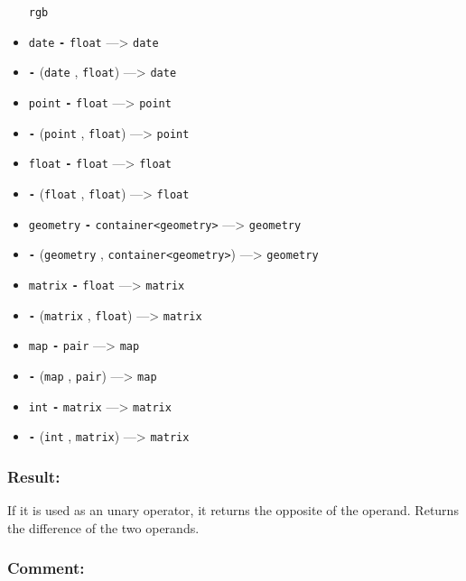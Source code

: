 \documentclass[]{book}
\theoremstyle{definition}
\theoremstyle{definition}
\theoremstyle{definition}
\theoremstyle{remark}
\begin{document}
\begin{itemize}
  \texttt{rgb}
\item
  \texttt{date} \textbf{\texttt{-}} \texttt{float} ---\textgreater{}
  \texttt{date}
\item
  \textbf{\texttt{-}} (\texttt{date} , \texttt{float}) ---\textgreater{}
  \texttt{date}
\item
  \texttt{point} \textbf{\texttt{-}} \texttt{float} ---\textgreater{}
  \texttt{point}
\item
  \textbf{\texttt{-}} (\texttt{point} , \texttt{float})
  ---\textgreater{} \texttt{point}
\item
  \texttt{float} \textbf{\texttt{-}} \texttt{float} ---\textgreater{}
  \texttt{float}
\item
  \textbf{\texttt{-}} (\texttt{float} , \texttt{float})
  ---\textgreater{} \texttt{float}
\item
  \texttt{geometry} \textbf{\texttt{-}}
  \texttt{container\textless{}geometry\textgreater{}} ---\textgreater{}
  \texttt{geometry}
\item
  \textbf{\texttt{-}} (\texttt{geometry} ,
  \texttt{container\textless{}geometry\textgreater{}}) ---\textgreater{}
  \texttt{geometry}
\item
  \texttt{matrix} \textbf{\texttt{-}} \texttt{float} ---\textgreater{}
  \texttt{matrix}
\item
  \textbf{\texttt{-}} (\texttt{matrix} , \texttt{float})
  ---\textgreater{} \texttt{matrix}
\item
  \texttt{map} \textbf{\texttt{-}} \texttt{pair} ---\textgreater{}
  \texttt{map}
\item
  \textbf{\texttt{-}} (\texttt{map} , \texttt{pair}) ---\textgreater{}
  \texttt{map}
\item
  \texttt{int} \textbf{\texttt{-}} \texttt{matrix} ---\textgreater{}
  \texttt{matrix}
\item
  \textbf{\texttt{-}} (\texttt{int} , \texttt{matrix}) ---\textgreater{}
  \texttt{matrix}
\end{itemize}

\subsubsection{Result:}\label{result}

If it is used as an unary operator, it returns the opposite of the
operand. Returns the difference of the two operands.

\subsubsection{Comment:}\label{comment}
\end{document}
